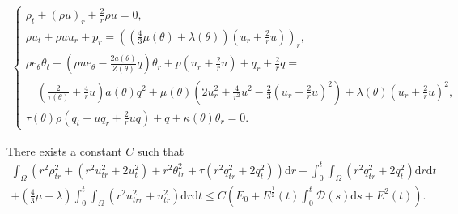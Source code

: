 \documentclass[10pt,a4paper]{amsart}
\newcommand{\dif}{\mathrm{d}}
\newcommand{\intx}{\int_0^t \int_{\Omega} }
\begin{document}
\begin{align}\label{1.5}
\begin{cases}
	\rho_t+(\rho u)_r+\frac{2}{r} \rho u = 0, \\
	\rho u_t+\rho u u_r+ p_r =\left( \left(\frac{4}{3} \mu(\theta)+\lambda(\theta)\right)\left(u_{r}+\frac{2}{r}u \right)\right)_r ,\\
	\rho e_\theta \theta_t + (\rho u e_\theta - \frac{2a(\theta)}{Z(\theta)} q)\theta_r + p\left(u_r+\frac{2}{r} u\right) + q_r + \frac{2}{r} q = \\
	\quad  \left(\frac{2}{\tau(\theta)}+\frac{4}{r} u\right) a(\theta) q^2 + \mu(\theta)\left( 2u_r^2+\frac{4}{r^2}u^2 - \frac{2}{3} \left(u_r+\frac{2}{r} u\right)^2\right) + \lambda(\theta)\left(u_r+\frac{2}{r} u\right)^2, \\
	\tau (\theta) \rho \left(q_t+u q_r+\frac{2}{r} u q\right) + q + \kappa(\theta) \theta_r = 0.
\end{cases}
\end{align}

 \begin{lemma}\label{le6}
 There exists a constant $C$ such that
 \begin{align}
 \int_{\Omega} \left( r^2 \rho_{tr}^2+(r^2 u_{tr}^2+2u_t^2)+r^2 \theta_{tr}^2 +\tau( r^2 q_{tr}^2+2q_t^2) \right) \dif r + \intx (r^2q_{tr}^2+2q_t^2)\dif r \dif t \nonumber\\
 +\left(\frac{4}{3} \mu+\lambda\right) \intx (r^2 u_{trr}^2+u_{tr}^2) \dif r \dif t\le C(E_0+E^\frac{1}{2}(t) \int_0^t  \mathcal D(s)\dif s+E^2(t)). \label{1.40}
 \end{align}
 \end{lemma}
\end{document}
